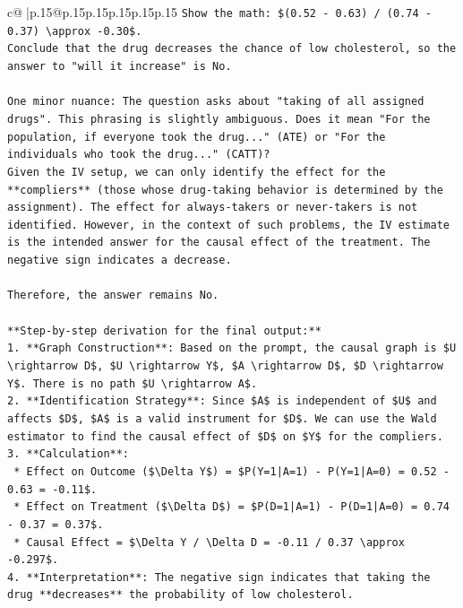\documentclass{article}
\begin{document}
{\begin{supertabular}{c@{$\;$}|p{.15\linewidth}@{}p{.15\linewidth}p{.15\linewidth}p{.15\linewidth}p{.15\linewidth}p{.15\linewidth}}
{{{\texttt{Show the math: \$(0.52 {-} 0.63) / (0.74 {-} 0.37) \textbackslash{}approx {-}0.30\$.} \\
\texttt{Conclude that the drug decreases the chance of low cholesterol, so the answer to "will it increase" is No.} \\
\\ 
\texttt{One minor nuance: The question asks about "taking of all assigned drugs". This phrasing is slightly ambiguous. Does it mean "For the population, if everyone took the drug..." (ATE) or "For the individuals who took the drug..." (CATT)?} \\
\texttt{Given the IV setup, we can only identify the effect for the **compliers** (those whose drug{-}taking behavior is determined by the assignment). The effect for always{-}takers or never{-}takers is not identified. However, in the context of such problems, the IV estimate is the intended answer for the causal effect of the treatment. The negative sign indicates a decrease.} \\
\\ 
\texttt{Therefore, the answer remains No.} \\
\\ 
\texttt{**Step{-}by{-}step derivation for the final output:**} \\
\texttt{1.  **Graph Construction**: Based on the prompt, the causal graph is \$U \textbackslash{}rightarrow D\$, \$U \textbackslash{}rightarrow Y\$, \$A \textbackslash{}rightarrow D\$, \$D \textbackslash{}rightarrow Y\$. There is no path \$U \textbackslash{}rightarrow A\$.} \\
\texttt{2.  **Identification Strategy**: Since \$A\$ is independent of \$U\$ and affects \$D\$, \$A\$ is a valid instrument for \$D\$. We can use the Wald estimator to find the causal effect of \$D\$ on \$Y\$ for the compliers.} \\
\texttt{3.  **Calculation**:} \\
\texttt{    *   Effect on Outcome (\$\textbackslash{}Delta Y\$) = \$P(Y=1|A=1) {-} P(Y=1|A=0) = 0.52 {-} 0.63 = {-}0.11\$.} \\
\texttt{    *   Effect on Treatment (\$\textbackslash{}Delta D\$) = \$P(D=1|A=1) {-} P(D=1|A=0) = 0.74 {-} 0.37 = 0.37\$.} \\
\texttt{    *   Causal Effect = \$\textbackslash{}Delta Y / \textbackslash{}Delta D = {-}0.11 / 0.37 \textbackslash{}approx {-}0.297\$.} \\
\texttt{4.  **Interpretation**: The negative sign indicates that taking the drug **decreases** the probability of low cholesterol.} \\
}}}
\end{supertabular}}
\end{document}

